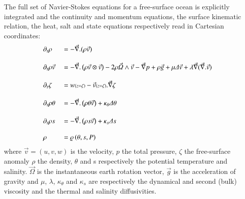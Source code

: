 \indent The full set of Navier-Stokes equations for a free-surface ocean is explicitly integrated and the continuity and momentum equations, the surface kinematic relation, the heat, salt and state equations respectively read in Cartesian coordinates: 
\begin{alignat}{2}
  \displaystyle
   &\partial_t\rho &&=-\vec{\nabla}.(\rho\vec{v})\\[3mm]
   \label{momentum}
   &\partial_t\rho\vec{v} &&=
   -\vec{\nabla}.\left(\rho\vec{v}\otimes\vec{v}\right)
   -2\rho\vec{\Omega}\wedge\vec{v}
   -\vec\nabla p+\rho\vec{g}
   +\mu\Delta\vec{v}
   +\lambda\vec{\nabla}(\vec{\nabla}.\vec{v})\\[3mm]
   &\partial_t{\zeta} &&= 
   w\scriptstyle(z=\zeta)\textstyle
   -\vec{v}\scriptstyle(z=\zeta)\textstyle.\vec{\nabla}{\zeta}\\[3mm]
   &\partial_t{\rho\theta} &&=-\vec{\nabla}.\left(\rho\theta\vec{v}\right)
   +\kappa_{\theta}\Delta\theta\\[3mm]
   &\partial_t{\rho s} &&=-\vec{\nabla}.\left(\rho s\vec{v}\right)
   +\kappa_{s}\Delta s\\[3mm]
   &\rho &&=\varrho\left(\theta,s,P\right)
\end{alignat}
where $\vec{v}=(u,v,w)$ is the velocity, $p$ the total pressure, $\zeta$ the free-surface anomaly $\rho$ the density, $\theta$ and s respectively the potential temperature and salinity. $\vec{\Omega}$ is the instantaneous earth rotation vector, $\vec{g}$ is the acceleration of gravity and $\mu$, $\lambda$, $\kappa_{\theta}$ and $\kappa_{s}$ are respectively the dynamical and second (bulk) viscosity and the thermal and salinity diffusivities.

   
